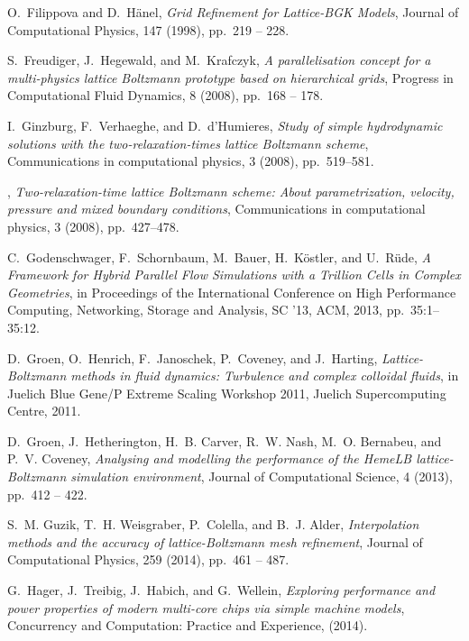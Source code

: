 \documentclass[final,leqno,onefignum,onetabnum]{siamltex1213}
\begin{document}
\begin{thebibliography}{10}
{\sc O.~Filippova and D.~Hänel}, {\em {Grid Refinement for Lattice-BGK
  Models}}, Journal of Computational Physics, 147 (1998), pp.~219 -- 228.

{\sc S.~Freudiger, J.~Hegewald, and M.~Krafczyk}, {\em A parallelisation
  concept for a multi-physics lattice {Boltzmann} prototype based on
  hierarchical grids}, Progress in Computational Fluid Dynamics, 8 (2008),
  pp.~168 -- 178.

{\sc I.~Ginzburg, F.~Verhaeghe, and D.~d'Humieres}, {\em Study of simple
  hydrodynamic solutions with the two-relaxation-times lattice {Boltzmann}
  scheme}, Communications in computational physics, 3 (2008), pp.~519--581.

\leavevmode\vrule height 2pt depth -1.6pt width 23pt, {\em Two-relaxation-time
  lattice {Boltzmann} scheme: {About} parametrization, velocity, pressure and
  mixed boundary conditions}, Communications in computational physics, 3
  (2008), pp.~427--478.

{\sc C.~Godenschwager, F.~Schornbaum, M.~Bauer, H.~K\"{o}stler, and
  U.~R\"{u}de}, {\em {A Framework for Hybrid Parallel Flow Simulations with a
  Trillion Cells in Complex Geometries}}, in Proceedings of the International
  Conference on High Performance Computing, Networking, Storage and Analysis,
  SC '13, ACM, 2013, pp.~35:1--35:12.

{\sc D.~Groen, O.~Henrich, F.~Janoschek, P.~Coveney, and J.~Harting}, {\em
  {Lattice-Boltzmann} methods in fluid dynamics: {Turbulence} and complex
  colloidal fluids}, in Juelich Blue Gene/P Extreme Scaling Workshop 2011,
  Juelich Supercomputing Centre, 2011.

{\sc D.~Groen, J.~Hetherington, H.~B. Carver, R.~W. Nash, M.~O. Bernabeu, and
  P.~V. Coveney}, {\em Analysing and modelling the performance of the {HemeLB}
  lattice-{Boltzmann} simulation environment}, Journal of Computational
  Science, 4 (2013), pp.~412 -- 422.

{\sc S.~M. Guzik, T.~H. Weisgraber, P.~Colella, and B.~J. Alder}, {\em
  Interpolation methods and the accuracy of lattice-{Boltzmann} mesh
  refinement}, Journal of Computational Physics, 259 (2014), pp.~461 -- 487.

{\sc G.~Hager, J.~Treibig, J.~Habich, and G.~Wellein}, {\em Exploring
  performance and power properties of modern multi-core chips via simple
  machine models}, Concurrency and Computation: Practice and Experience,
  (2014).


\end{thebibliography}
\end{document}
